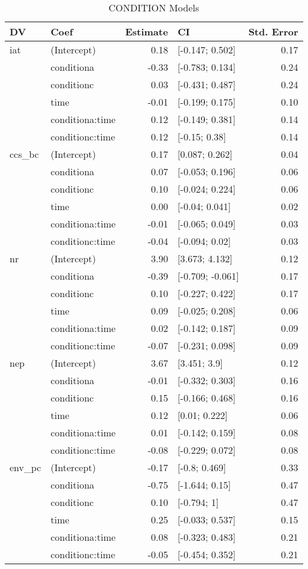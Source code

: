 \begin{table}[ht]
\centering
\begin{tabular}{llrlr}
  \hline
DV & Coef & Estimate & CI & Std. Error \\ 
  \hline
iat & (Intercept) & 0.18 & [-0.147; 0.502] & 0.17 \\ 
   & conditiona & -0.33 & [-0.783; 0.134] & 0.24 \\ 
   & conditionc & 0.03 & [-0.431; 0.487] & 0.24 \\ 
   & time & -0.01 & [-0.199; 0.175] & 0.10 \\ 
   & conditiona:time & 0.12 & [-0.149; 0.381] & 0.14 \\ 
   & conditionc:time & 0.12 & [-0.15; 0.38] & 0.14 \\ 
   \hline
ccs\_bc & (Intercept) & 0.17 & [0.087; 0.262] & 0.04 \\ 
   & conditiona & 0.07 & [-0.053; 0.196] & 0.06 \\ 
   & conditionc & 0.10 & [-0.024; 0.224] & 0.06 \\ 
   & time & 0.00 & [-0.04; 0.041] & 0.02 \\ 
   & conditiona:time & -0.01 & [-0.065; 0.049] & 0.03 \\ 
   & conditionc:time & -0.04 & [-0.094; 0.02] & 0.03 \\ 
   \hline
nr & (Intercept) & 3.90 & [3.673; 4.132] & 0.12 \\ 
   & conditiona & -0.39 & [-0.709; -0.061] & 0.17 \\ 
   & conditionc & 0.10 & [-0.227; 0.422] & 0.17 \\ 
   & time & 0.09 & [-0.025; 0.208] & 0.06 \\ 
   & conditiona:time & 0.02 & [-0.142; 0.187] & 0.09 \\ 
   & conditionc:time & -0.07 & [-0.231; 0.098] & 0.09 \\ 
   \hline
nep & (Intercept) & 3.67 & [3.451; 3.9] & 0.12 \\ 
   & conditiona & -0.01 & [-0.332; 0.303] & 0.16 \\ 
   & conditionc & 0.15 & [-0.166; 0.468] & 0.16 \\ 
   & time & 0.12 & [0.01; 0.222] & 0.06 \\ 
   & conditiona:time & 0.01 & [-0.142; 0.159] & 0.08 \\ 
   & conditionc:time & -0.08 & [-0.229; 0.072] & 0.08 \\ 
   \hline
env\_pc & (Intercept) & -0.17 & [-0.8; 0.469] & 0.33 \\ 
   & conditiona & -0.75 & [-1.644; 0.15] & 0.47 \\ 
   & conditionc & 0.10 & [-0.794; 1] & 0.47 \\ 
   & time & 0.25 & [-0.033; 0.537] & 0.15 \\ 
   & conditiona:time & 0.08 & [-0.323; 0.483] & 0.21 \\ 
   & conditionc:time & -0.05 & [-0.454; 0.352] & 0.21 \\ 
   \hline
\end{tabular}
\caption{CONDITION Models } 
\label{tab:condition-models}
\end{table}

